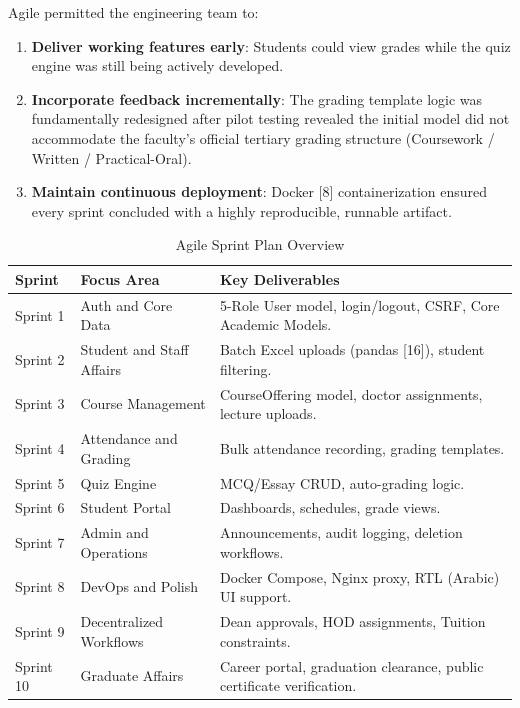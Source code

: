 Agile permitted the engineering team to:
\begin{enumerate}
    \item \textbf{Deliver working features early}: Students could view grades while the quiz engine was still being actively developed.
    \item \textbf{Incorporate feedback incrementally}: The grading template logic was fundamentally redesigned after pilot testing revealed the initial model did not accommodate the faculty's official tertiary grading structure (Coursework / Written / Practical-Oral).
    \item \textbf{Maintain continuous deployment}: Docker [8] containerization ensured every sprint concluded with a highly reproducible, runnable artifact.
\end{enumerate}

\begin{table}[H]
    \centering
    \renewcommand{\arraystretch}{1.2}
    \begin{tabular}{|p{}|p{}|p{}|}
        \hline
        \textbf{Sprint} & \textbf{Focus Area} & \textbf{Key Deliverables} \\
        \hline
        Sprint 1 & Auth and Core Data & 5-Role User model, login/logout, CSRF, Core Academic Models. \\
        Sprint 2 & Student and Staff Affairs & Batch Excel uploads (pandas [16]), student filtering. \\
        Sprint 3 & Course Management & CourseOffering model, doctor assignments, lecture uploads. \\
        Sprint 4 & Attendance and Grading & Bulk attendance recording, grading templates. \\
        Sprint 5 & Quiz Engine & MCQ/Essay CRUD, auto-grading logic. \\
        Sprint 6 & Student Portal & Dashboards, schedules, grade views. \\
        Sprint 7 & Admin and Operations & Announcements, audit logging, deletion workflows. \\
        Sprint 8 & DevOps and Polish & Docker Compose, Nginx proxy, RTL (Arabic) UI support. \\
        Sprint 9 & Decentralized Workflows & Dean approvals, HOD assignments, Tuition constraints. \\
        Sprint 10 & Graduate Affairs & Career portal, graduation clearance, public certificate verification. \\
        \hline
    \end{tabular}
    \caption{Agile Sprint Plan Overview}
    \label{tab:sprints}
\end{table}

